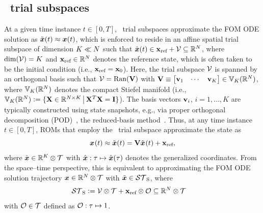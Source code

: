 \documentclass[3p,computermodern,10pt]{elsarticle}
\begin{document}
\subsection{\spatialAcronym\ trial subspaces}
At a given time instance 
$t\in[0,T]$,
\spatialAcronym\ trial subspaces approximate the FOM ODE solution
	as $\tilde{\boldsymbol x}(t)\approx{\boldsymbol x}(t)$, which is enforced to reside in an
	affine spatial trial subspace of dimension $K\ll N$ such that
	$\tilde{\boldsymbol x}(t)\in
	\mathbf{x}_\text{ref}+\mathcal{V }
\subseteq\mathbb{R}^{N}$, where $\dim(\mathcal{V }) = K$
and $\mathbf{x}_\text{ref} \in \mathbb{R}^{N}$ denotes the reference state, which
	is often taken to be the initial condition (i.e., $\mathbf{x}_\text{ref} = {{\mathbf{x}}_0}$).
Here, the trial subspace
$\mathcal{V }$ 
is spanned by an orthogonal basis such that
$ \mathcal{V }= \mathrm{Ran}(\mathbf {V})$
with 
$ \mathbf {V} \equiv \begin{bmatrix}  \mathbf{v}_1  & \cdots &  \mathbf{v}_K \end{bmatrix}
	\in \mathbb{V}_{K}(\mathbb{R}^{N})$, where $\mathbb{V}_{K}(\mathbb{R}^{N})$ denotes the compact Stiefel manifold (i.e.,  $
	\mathbb{V}_{K}(\mathbb{R}^{N})\vcentcolon=
	\{ \mathbf{X} \in \mathbb{R}^{N
	\times K}\, \big|\, \mathbf{X}^T \mathbf{X} = \mathbf{I} \}$).
The basis vectors $\mathbf{v}_i$, $i=1,\ldots,K$ are typically constructed
using state snapshots, e.g., via
proper orthogonal decomposition (POD)~\cite{berkooz_turbulence_pod}, the reduced-basis method~\cite{rb_1,rb_2,rb_3,NgocCuong2005,Rozza2008}. 
Thus, at any time instance $t\in[0,T]$, ROMs that employ the  \spatialAcronym\ trial subspace approximate the state as
\begin{equation}\label{eq:affine_trialspace}
{\boldsymbol x}^{}(t) \approx \tilde{\boldsymbol x}(t) = \mathbf {V} \hat{ \boldsymbol x}^{}(t) + \mathbf{x}_\text{ref},
\end{equation}
where $\hat{ \boldsymbol x} \in \mathbb{R}^{K} \otimes \mathcal{T}$ with
$\hat{ \boldsymbol x}:\tau\mapsto\hat{ \boldsymbol x}(\tau)$
denotes the generalized
coordinates. From the space--time perspective, this is equivalent to approximating the
	FOM ODE solution trajectory ${\boldsymbol x}\in\mathbb{R}^{N}\otimes\mathcal{T}$ with 
	$\tilde{\boldsymbol x}\in \mathcal{ ST }_{\text{S}}$, where
\begin{equation}\label{eq:spatial_subspace}
\begin{split}
& \mathcal{ ST }_{\text{S}} \vcentcolon= \mathcal{V } \otimes \mathcal{T} +
	\mathbf{x}_\text{ref}\otimes\mathcal{O}\subseteq\mathbb{R}^{N}\otimes\mathcal{T}
\end{split}
\end{equation}
with $\mathcal{O}\in\mathcal{T}$ defined as
$\mathcal{O}:\tau\mapsto 1$.
	 
\end{document}
